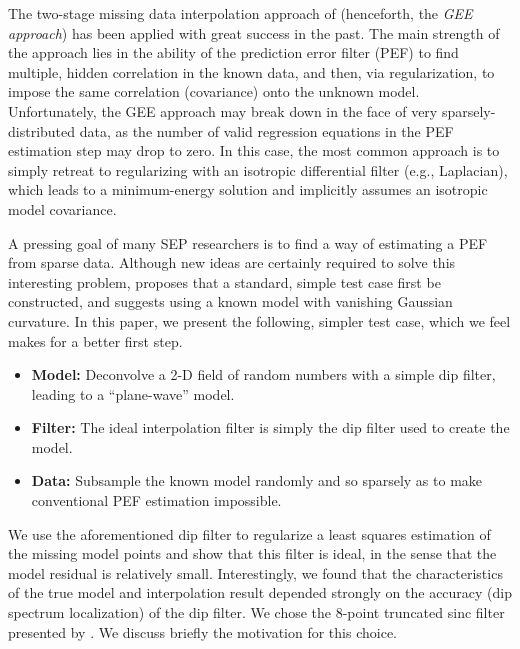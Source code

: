 The two-stage missing data interpolation approach of \cite{gee} (henceforth, the {\em GEE 
approach}) has been applied
with great success \cite[]{Fomel.sep.95.sergey1,Clapp.sep.97.bob1,Crawley.sep.104} in the past.  
The main strength of the approach lies in the ability of the prediction error filter (PEF) to 
find multiple, hidden correlation in the known data, and then, via regularization, to impose
the same correlation (covariance) onto the unknown model.
Unfortunately, the GEE approach may break down
in the face of very sparsely-distributed data, as the number of valid regression equations
in the PEF estimation step may drop to zero.  
In this case, the most common approach is to simply retreat to regularizing with an isotropic 
differential filter (e.g., Laplacian), which leads to a 
minimum-energy solution and implicitly assumes an isotropic model covariance.
\par
A pressing goal of many SEP researchers is to find a way of estimating a PEF from sparse
data.  Although new ideas are certainly required to solve this 
interesting problem, \cite{Claerbout.sep.103.jon5} proposes that a standard, simple test 
case first be constructed, and suggests using a known model with vanishing
Gaussian curvature.  In this paper, we present the following, simpler test case, which we
feel makes for a better first step.
\begin{itemize}
	\item {\bf Model:} Deconvolve a 2-D field of random numbers with a simple dip filter, 
	                   leading to a ``plane-wave'' model.
	\item {\bf Filter:} The ideal interpolation filter is simply the dip filter used to 
	                    create the model.
	\item {\bf Data:} Subsample the known model randomly and so sparsely as to make 
	                  conventional PEF estimation impossible.
\end{itemize}
\par
We use the aforementioned dip filter to regularize a least squares estimation of the
missing model points and show that this filter is ideal, in the sense that the
model residual is relatively small.  Interestingly, we found that the characteristics
of the true model and interpolation result depended strongly on the accuracy (dip
spectrum localization) of the dip filter.  We chose the 8-point truncated sinc filter
presented by \cite{Fomel.sep.105.sergey2}.  We discuss briefly the motivation for
this choice.

